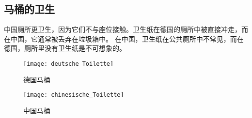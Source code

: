 \subsection{马桶的卫生}
    中国厕所更卫生，因为它们不与座位接触。卫生纸在德国的厕所中被直接冲走，而在中国，它通常被丢弃在垃圾箱中。 在中国，卫生纸在公共厕所中不常见，而在德国，厕所里没有卫生纸是不可想象的。

    \begin{figure}[htb]
        \centering
        \texttt{[image: deutsche\_Toilette]}
        \caption{德国马桶}
    \end{figure}

    \begin{figure}[htb]
        \centering
        \texttt{[image: chinesische\_Toilette]}
        \caption{中国马桶}
    \end{figure}